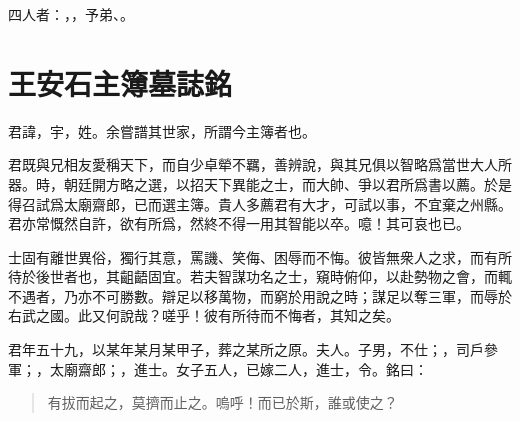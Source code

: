 四人者：，，予弟、。%

\section[泰州海陵縣主簿許君墓誌銘\quad{\small 王安石}]{{\normalsize 王安石}\quad {}主簿墓誌銘}
君諱，宇，姓。余嘗譜其世家，所謂今主簿者也。

君既與兄相友愛稱天下，而自少卓犖不羈，善{辨}說，與其兄俱以智略爲當世大人所器。時，朝廷開方略之選，以招天下異能之士，而大帥、爭以君所爲書以薦。於是得召試爲太廟齋郎，已而選主簿。貴人多薦君有大才，可試以事，不宜棄之州縣。君亦常慨然自許，欲有所爲，然終不得一用其智能以卒。噫！其可哀也已。%

士固有離世異俗，獨行其意，罵譏、笑侮、困辱而不悔。彼皆無衆人之求，而有所待於後世者也，其齟齬固宜。若夫智謀功名之士，窺時俯仰，以赴勢{物}之會，而輒不遇者，乃亦不可勝數。辯足以移萬物，而窮於用說之時；謀足以奪三軍，而辱於右武之國。此又何說哉？嗟乎！彼有所待而不悔者，其知之矣。%

君年五十九，以某年某月某甲子，葬之某所之原。夫人。子男，不仕；，司戶參軍；，太廟齋郎；，進士。女子五人，已嫁二人，進士，令。銘曰：

\begin{quote}
有拔而起之，莫擠而止之。嗚呼！而已於斯，誰或使之？
\end{quote}
\theendnotes
